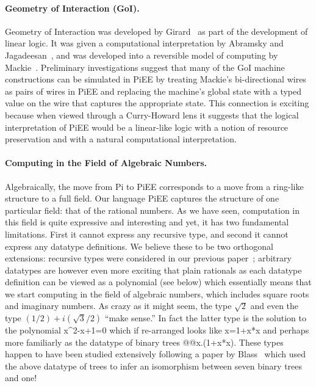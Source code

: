 \documentclass[preprint]{sigplanconf}
\begin{document}
\paragraph*{Geometry of Interaction (GoI).}
Geometry of Interaction was developed by Girard~\cite{girard1989geometry} as part of
the development of linear logic. It was given a computational interpretation
by Abramsky and Jagadeesan~\cite{Abramsky:1994:NFG:184662.184664}, and was
developed into a reversible model of computing by
Mackie~\cite{Mackie2011,DBLP:conf/popl/Mackie95}. Preliminary investigations
suggest that many of the GoI machine constructions can be simulated in
{{PiEE}} by treating Mackie's bi-directional wires as pairs of wires in
{{PiEE}} and replacing the machine's global state with a typed value on
the wire that captures the appropriate state. This connection is exciting
because when viewed through a Curry-Howard lens it suggests that the logical
interpretation of {{PiEE}} would be a linear-like logic with a notion of
resource preservation and with a natural computational interpretation. 

\paragraph*{Computing in the Field of Algebraic Numbers.}
\label{sec:algebraic-field}
Algebraically, the move from {{Pi}} to {{PiEE}} corresponds to a
move from a ring-like structure to a full field. Our language {{PiEE}}
captures the structure of one particular field: that of the rational
numbers. As we have seen, computation in this field is quite expressive and
interesting and yet, it has two fundamental limitations. First it cannot
express any recursive type, and second it cannot express any datatype
definitions. We believe these to be two orthogonal extensions: recursive
types were considered in our previous paper~\cite{infeffects}; arbitrary
datatypes are however even more exciting that plain rationals as each
datatype definition can be viewed as a polynomial (see below) which
essentially means that we start computing in the field of algebraic numbers,
which includes square roots and imaginary numbers. As crazy as it might seem,
the type $\sqrt{2}$ and even the type $(1/2)+i(\sqrt{3}/2)$ ``make sense.''
In fact the latter type is the solution to the polynomial {{x^2-x+1=0}} which
if re-arranged looks like {{x=1+x*x}} and perhaps more familiarly as the
datatype of binary trees {{@@x.(1+x*x)}}. These types happen to have been
studied extensively following a paper by Blass~\cite{seventrees} which used
the above datatype of trees to infer an isomorphism between seven binary
trees and one!
\end{document}
